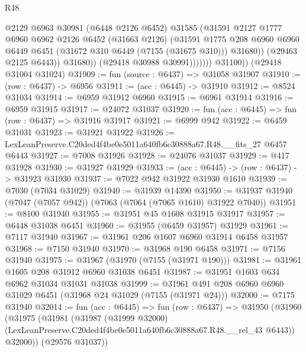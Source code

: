 \begin{lexlean}{R48}
\begin{coremodule}
                          @2129
                          @6963
                          @30981
                          (@6448 @2126 @6452)
                          @31585
                          (@31591
                            @2127
                            @1777
                            @6960
                            @6962
                            @2126
                            @6452
                            (@31663 @2126)
                            (@31591
                              @1775
                              @208
                              @6960
                              @6960
                              @6449
                              @6451
                              (@31672 @310 @6449 (@7155 (@31675 @310)))
                              @31680))
                          (@29463 @2125 @6443))
                        @31680))
                    (@29418 @30988 @30991)))))))
        @31100))
    (@29418 @31004 @31024)
@31909 := fun (source : @6437) => @31058 @31907
@31910 := (row : @6437) -> @6956
@31911 := (acc : @6445) -> @31910
@31912 := @8524 @31034
@31914 := @6959 @31912 @6960
@31915 := @6961 @31914
@31916 := @6959 @31915
@31917 := @24072 @31037
@31920 := fun (acc : @6445) => fun (row : @6437) => @31916 @31917
@31921 := @6999 @942
@31922 := @6459 @31031
@31923 := @31921 @31922
@31926 := LexLeanPreserve.C20ded4f4be0e5011a640fb6c30888a67.R48.__fits_27 @6457 @6443
@31927 := @7008 @31926
@31928 := @24076 @31037
@31929 := @417 @31928
@31930 := @31927 @31929
@31933 := (acc : @6445) -> (row : @6437) -> @31923 @31930
@31937 := @7022 @942 @31922 @31930 @1610
@31939 := @7030 (@7034 @31029)
@31940 := @31939 @14390
@31950 := @31937 @31940 (@7047 (@7057 @942)) (@7063 (@7064 (@7065 @1610) @31922 @7040))
@31951 := @8100 @31940
@31955 := @31951 @45 @1608 @31915 @31917
@31957 := @6448 @31038 @6451
@31960 := @31955 (@6459 @31957) @31929
@31961 := @7117 @31940
@31967 := @31961 @206 @1607 @6960 @31914 @6458 @31957
@31968 := @7150 @31940
@31970 := @31968 @190 @6458
@31971 := @7156 @31940
@31975 := @31967 (@31970 (@7155 (@31971 @190)))
@31981 := @31961 @1605 @208 @31912 @6960 @31038 @6451
@31987 := @31951 @1603 @634 @6962 @31034 @31031 @31038
@31999 := @31961 @491 @208 @6960 @6960 @31029 @6451 (@31968 @24 @31029 (@7155 (@31971 @24)))
@32000 := @7175 @31940
@32014 := fun (acc : @6445) =>
  fun (row : @6437) =>
  @31950
    (@31960
      (@31975
        (@31981
          (@31987
            (@31999 @32000)
            (LexLeanPreserve.C20ded4f4be0e5011a640fb6c30888a67.R48.__rel_43 @6443))
          @32000))
      (@29576 @31037))

\end{coremodule}
\end{lexlean}
